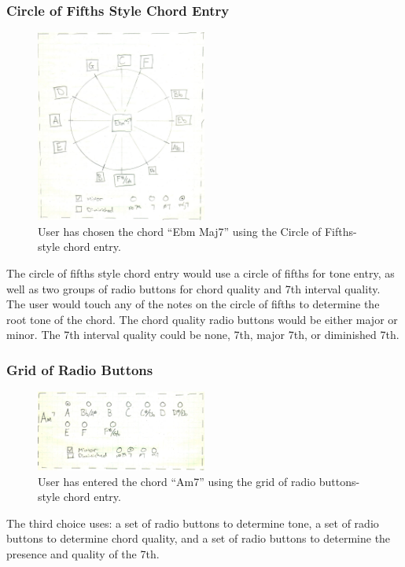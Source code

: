 \documentclass[onecolumn, draftclsnofoot,10pt, compsoc]{IEEEtran}
\begin{document}
\subsubsection{Circle of Fifths Style Chord Entry}
\begin{figure}[h]
  \includegraphics[width=0.5\textwidth]{circle.png}
  \caption{User has chosen the chord ``Ebm Maj7'' using the Circle of Fifths-style chord entry.}
\end{figure}

The circle of fifths style chord entry would use a circle of fifths for tone entry, as well as two groups of radio buttons for chord quality and 7th interval quality.
The user would touch any of the notes on the circle of fifths to determine the root tone of the chord. 
The chord quality radio buttons would be either major or minor. 
The 7th interval quality could be none, 7th, major 7th, or diminished 7th. 

\subsubsection{Grid of Radio Buttons}
\begin{figure}[h]
  \includegraphics[width=0.5\textwidth]{radio.png}
  \caption{User has entered the chord ``Am7'' using the grid of radio buttons-style chord entry.}
\end{figure}

The third choice uses: a set of radio buttons to determine tone, a set of radio buttons to determine chord quality, and a set of radio buttons to determine the presence and quality of the 7th. 
\end{document}
